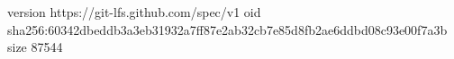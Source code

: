 version https://git-lfs.github.com/spec/v1
oid sha256:60342dbeddb3a3eb31932a7ff87e2ab32cb7e85d8fb2ae6ddbd08c93e00f7a3b
size 87544
